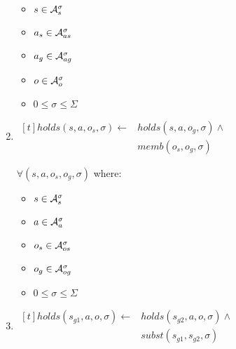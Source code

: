 \documentclass[10pt, twocolumn]{article}
\begin{document}
\begin{enumerate}
                \begin{itemize}
                  \item
                    $s \in {\cal A}^{\sigma}_{s}$
                  \item
                    $a_{s} \in {\cal A}^{\sigma}_{as}$
                  \item
                    $a_{g} \in {\cal A}^{\sigma}_{ag}$
                  \item
                    $o \in {\cal A}^{\sigma}_{o}$
                  \item
                    $0 \leq \sigma \leq \Sigma$
                \end{itemize}
              \item
                \begin{math}
                  \begin{aligned}[t]
                    holds(s, a, o_{s}, \sigma) \leftarrow &
                    holds(s, a, o_{g}, \sigma) \land \\
                    & memb(o_{s}, o_{g}, \sigma)
                  \end{aligned}
                \end{math}

                $\forall (s, a, o_{s}, o_{g}, \sigma)$ where:

                \begin{itemize}
                  \item
                    $s \in {\cal A}^{\sigma}_{s}$
                  \item
                    $a \in {\cal A}^{\sigma}_{a}$
                  \item
                    $o_{s} \in {\cal A}^{\sigma}_{os}$
                  \item
                    $o_{g} \in {\cal A}^{\sigma}_{og}$
                  \item
                    $0 \leq \sigma \leq \Sigma$
                \end{itemize}
              \item
                \begin{math}
                  \begin{aligned}[t]
                    holds(s_{g1}, a, o, \sigma) \leftarrow &
                    holds(s_{g2}, a, o, \sigma) \land \\
                    & subst(s_{g1}, s_{g2}, \sigma)
                  \end{aligned}
                \end{math}


\end{enumerate}
\end{document}

